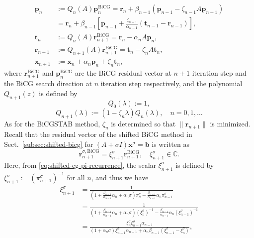 \[\begin{aligned}\bm p_n&:=Q_n(A)\bm p_n^{\mathrm{BiCG}}=\bm r_n+\beta_{n-1}(\bm p_{n-1}-\zeta_{n-1}A\bm p_{n-1})\\&=\bm r_n+\beta_{n-1}\left[\bm p_{n-1}+\frac{\zeta_{n-1}}{\alpha_{n-1}}(\bm t_{n-1}-\bm r_{n-1})\right],\\
\bm t_n&:=Q_n(A)\bm r_{n+1}^{\mathrm{BiCG}}=\bm r_n-\alpha_nA\bm p_n,\\
\bm r_{n+1}&:=Q_{n+1}(A)\bm r_{n+1}^{\mathrm{BiCG}}=\bm t_n-\zeta_nA\bm t_n,\\
\bm x_{n+1}&:=\bm x_n+\alpha_n\bm p_n+\zeta_n\bm t_n,\end{aligned}\]
{where $\bm r_{n+1}^{\mathrm{BiCG}}$ and $\bm p_n^{\mathrm{BiCG}}$ are the BiCG residual vector at $n+1$ iteration step and the BiCG search direction at $n$ iteration step respectively, and the polynomial $Q_{n+1}(z)$ is defined by}
\begin{equation}\label{eq:shifted-bicgstab-seed-polynomial-initial}Q_0(\lambda):=1,\end{equation}
\begin{equation}\label{eq:shifted-bicgstab-seed-polynomial-recurrence}Q_{n+1}(\lambda):=(1-\zeta_n\lambda)Q_n(\lambda),\quad n=0,1,\ldots\end{equation}
{As for the BiCGSTAB method, $\zeta_n$ is determined so that $\|\bm r_{n+1}\|$ is minimized. Recall that the residual vector of the shifted BiCG method in Sect.\ \ref{subsec:shifted-bicg} for $(A+\sigma I)\bm x^{\sigma}=\bm b$ is written as}
\[\bm r_{n+1}^{\sigma,\mathrm{BiCG}}=\xi_{n+1}^{\sigma}\bm r_{n+1}^{\mathrm{BiCG}},\quad\xi_{n+1}^{\sigma}\in\mathbb C.\]
{Here, from \eqref{eq:shifted-cg-pi-recurrence}, the scalar $\xi_{n+1}^{\sigma}$ is defined by $\xi_{n+1}^{\sigma}:=(\pi_{n+1}^{\sigma})^{-1}$ for all $n$, and thus we have}
\begin{equation}\label{eq:shifted-bicgstab-xi-recurrence}\begin{aligned}\xi_{n+1}^{\sigma}&=\frac1{\left(1+\frac{\beta_{n-1}}{\alpha_{n-1}}\alpha_n+\alpha_n\sigma\right)\pi_n^{\sigma}-\frac{\beta_{n-1}}{\alpha_{n-1}}\alpha_n\pi_{n-1}^{\sigma}}\\
&=\frac1{\left(1+\frac{\beta_{n-1}}{\alpha_{n-1}}\alpha_n+\alpha_n\sigma\right)(\xi_n^{\sigma})^{-1}-\frac{\beta_{n-1}}{\alpha_{n-1}}\alpha_n(\xi_{n-1}^{\sigma})^{-1}}\\
&=\frac{\xi_n^{\sigma}\xi_{n-1}^{\sigma}\alpha_{n-1}}{(1+\alpha_n\sigma)\xi_{n-1}^{\sigma}\alpha_{n-1}+\alpha_n\beta_{n-1}(\xi_{n-1}^{\sigma}-\xi_n^{\sigma})},\end{aligned}\end{equation}
